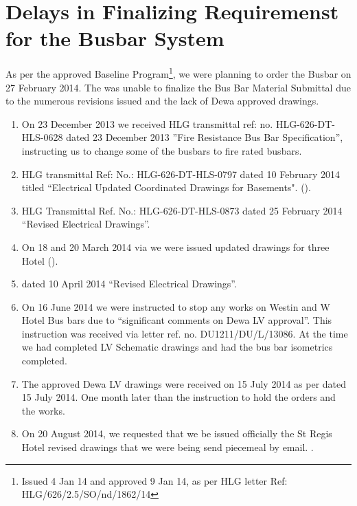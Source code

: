 
\chapter{Delays in Finalizing Requiremenst for the Busbar System}

As per the approved Baseline Program\footnote{Issued 4 Jan 14 and approved 9 Jan 14, as per HLG letter Ref: HLG/626/2.5/SO/nd/1862/14},  we were planning to order the Busbar on 27 February 2014. The \JV was unable to finalize the Bus Bar Material Submittal due to the numerous revisions issued and the lack of Dewa approved drawings.

\begin{enumerate}
\item On 23 December 2013 we received HLG transmittal ref: no. HLG-626-DT-HLS-0628 dated 23 December 2013 ''Fire Resistance Bus Bar Specification'', instructing us to change some of the busbars to fire rated busbars.
\label{fireratedbusbar}

\item HLG transmittal Ref: No.: HLG-626-DT-HLS-0797 dated 10 February 2014 titled ``Electrical Updated Coordinated Drawings for Basements". ().

\item HLG Transmittal Ref. No.: HLG-626-DT-HLS-0873 dated 25 February 2014 ``Revised Electrical Drawings''.

\item On 18 and 20 March 2014 via  we were issued updated drawings for three Hotel ().  

\item {} dated 10 April 2014 ``Revised Electrical Drawings''. 

\item On 16 June 2014 we were instructed to stop any works on Westin and W Hotel Bus bars due to ``significant comments on Dewa LV approval''. This instruction was received via \KA letter ref. no. DU1211/DU/L/13086. At the time we had completed LV Schematic drawings and had the bus bar isometrics completed. 

\item The approved Dewa LV drawings were received on 15 July 2014 as per  dated 15 July 2014. One month later than the instruction to hold the orders and the works.

\item On 20 August 2014, we requested that we be issued officially the St Regis Hotel revised drawings that we were being send piecemeal by email. .


\end{enumerate}
